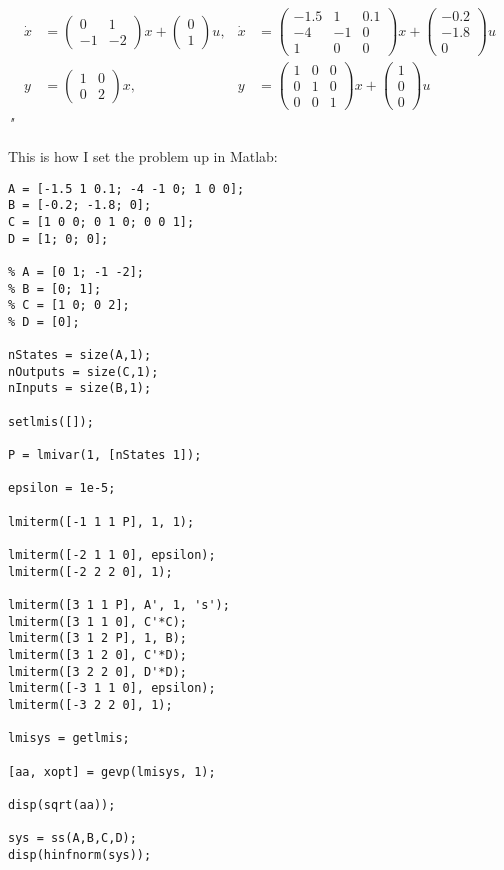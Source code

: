 \documentclass[12pt, letterpaper]{article}
\begin{document}
\[
\begin{aligned}
\dot{x} &= \begin{pmatrix}
0 & 1 \\
-1 & -2
\end{pmatrix} x + \begin{pmatrix}
0 \\
1
\end{pmatrix} u, & 
\dot{x} &= \begin{pmatrix}
-1.5 & 1 & 0.1 \\
-4 & -1 & 0 \\
1 & 0 & 0
\end{pmatrix} x + \begin{pmatrix}
-0.2 \\
-1.8 \\
0
\end{pmatrix} u \\
y &= \begin{pmatrix}
1 & 0 \\
0 & 2
\end{pmatrix} x, & 
y &= \begin{pmatrix}
1 & 0 & 0 \\
0 & 1 & 0 \\
0 & 0 & 1
\end{pmatrix} x + \begin{pmatrix}
1 \\
0 \\
0
\end{pmatrix} u
\end{aligned}
\]
\textit{"}

This is how I set the problem up in Matlab:

\begin{lstlisting}[style=matlabstyle]
A = [-1.5 1 0.1; -4 -1 0; 1 0 0];
B = [-0.2; -1.8; 0];
C = [1 0 0; 0 1 0; 0 0 1];
D = [1; 0; 0];

% A = [0 1; -1 -2];
% B = [0; 1];
% C = [1 0; 0 2];
% D = [0];

nStates = size(A,1);
nOutputs = size(C,1);
nInputs = size(B,1);

setlmis([]);

P = lmivar(1, [nStates 1]);

epsilon = 1e-5;

lmiterm([-1 1 1 P], 1, 1);

lmiterm([-2 1 1 0], epsilon);
lmiterm([-2 2 2 0], 1);

lmiterm([3 1 1 P], A', 1, 's');
lmiterm([3 1 1 0], C'*C);
lmiterm([3 1 2 P], 1, B);
lmiterm([3 1 2 0], C'*D);
lmiterm([3 2 2 0], D'*D);
lmiterm([-3 1 1 0], epsilon);
lmiterm([-3 2 2 0], 1);

lmisys = getlmis;

[aa, xopt] = gevp(lmisys, 1);

disp(sqrt(aa));

sys = ss(A,B,C,D);
disp(hinfnorm(sys));    
\end{lstlisting}
\end{document}

